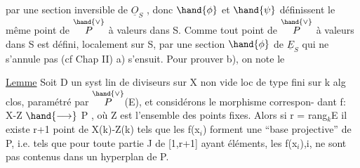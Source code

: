
par une section inversible de $\underline{O}_S$ , donc $\hand{\phi}$ et $\hand{\psi}$ définissent le même point
de $\overset{\hand{\vee}}{P}$ à valeurs dans S. Comme tout point de $\overset{\hand{\vee}}{P}$ à valeurs dans S est défini,
localement sur S, par une section $\hand{\phi}$ de $\underline{E}_S$ qui ne s'annule pas (cf Chap II)
a) s'ensuit.   Pour prouver b), on note le

\uline{Lemme}   Soit D un syst lin de diviseurs sur X non vide loc de type fini
sur k alg clos, paramétré par $\overset{\hand{\vee}}{P}$(E), et considérons le morphisme correspon-%
dant  f: X-Z $\hand{\longrightarrow}$ P , où Z est l'ensemble des points fixes. Alors  si
r = rang$_k$E  il existe  r+1 point de  X(k)-Z(k)  tels que les
f(x$_i$) forment une  ``base projective'' de P, i.e. tels que  pour toute
partie J de [1,r+1] ayant   éléments,  les  f(x$_i$),i,  ne sont pas
contenus dans un hyperplan de P.

